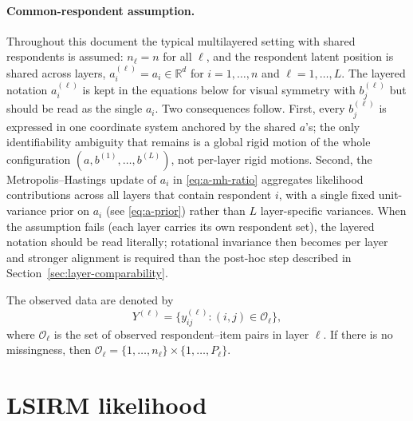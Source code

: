 \documentclass[11pt]{article}
\newcommand{\R}{\mathbb R}
\begin{document}
\paragraph{Common-respondent assumption.}
Throughout this document the typical multilayered setting with shared
respondents is assumed: $n_\ell=n$ for all $\ell$, and the respondent latent
position is shared across layers,
$a_i^{(\ell)}=a_i\in\R^d$ for $i=1,\dots,n$ and $\ell=1,\dots,L$.  The
layered notation $a_i^{(\ell)}$ is kept in the equations below for visual
symmetry with $b_j^{(\ell)}$ but should be read as the single $a_i$.  Two
consequences follow.  First, every $b_j^{(\ell)}$ is expressed in one
coordinate system anchored by the shared $a$'s; the only identifiability
ambiguity that remains is a global rigid motion of the whole configuration
$(a,b^{(1)},\dots,b^{(L)})$, not per-layer rigid motions.  Second, the
Metropolis--Hastings update of $a_i$ in \eqref{eq:a-mh-ratio} aggregates
likelihood contributions across all layers that contain respondent $i$, with
a single fixed unit-variance prior on $a_i$ (see \eqref{eq:a-prior}) rather
than $L$ layer-specific variances.  When the assumption fails (each layer
carries its own respondent set), the layered notation should be read
literally; rotational invariance then becomes per layer and stronger
alignment is required than the post-hoc step described in
Section~\ref{sec:layer-comparability}.

The observed data are denoted by
\[
    Y^{(\ell)}=\{y_{ij}^{(\ell)}:(i,j)\in\mathcal O_\ell\},
\]
where $\mathcal O_\ell$ is the set of observed respondent--item pairs in layer
$\ell$.  If there is no missingness, then
$\mathcal O_\ell=\{1,\dots,n_\ell\}\times\{1,\dots,P_\ell\}$.

\section{LSIRM likelihood}
\end{document}
